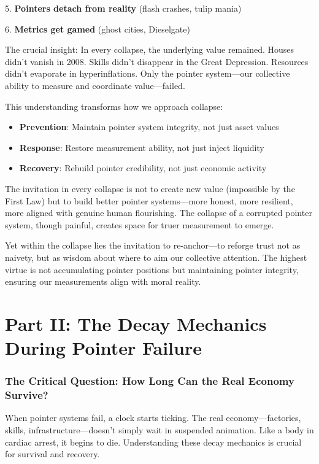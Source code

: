 \documentclass[11pt,oneside]{book}
\begin{document}
5. \textbf{Pointers detach from reality} (flash crashes, tulip mania)


6. \textbf{Metrics get gamed} (ghost cities, Dieselgate)


The crucial insight: In every collapse, the underlying value remained. Houses didn't vanish in 2008. Skills didn't disappear in the Great Depression. Resources didn't evaporate in hyperinflations. Only the pointer system—our collective ability to measure and coordinate value—failed.

This understanding transforms how we approach collapse:
\begin{itemize}
\item \textbf{Prevention}: Maintain pointer system integrity, not just asset values
\item \textbf{Response}: Restore measurement ability, not just inject liquidity
\item \textbf{Recovery}: Rebuild pointer credibility, not just economic activity
\end{itemize}

The invitation in every collapse is not to create new value (impossible by the First Law) but to build better pointer systems—more honest, more resilient, more aligned with genuine human flourishing. The collapse of a corrupted pointer system, though painful, creates space for truer measurement to emerge.

Yet within the collapse lies the invitation to re-anchor—to reforge trust not as naivety, but as wisdom about where to aim our collective attention. The highest virtue is not accumulating pointer positions but maintaining pointer integrity, ensuring our measurements align with moral reality.

\section{Part II: The Decay Mechanics During Pointer Failure}

\subsubsection{The Critical Question: How Long Can the Real Economy Survive?}

When pointer systems fail, a clock starts ticking. The real economy—factories, skills, infrastructure—doesn't simply wait in suspended animation. Like a body in cardiac arrest, it begins to die. Understanding these decay mechanics is crucial for survival and recovery.
\end{document}
